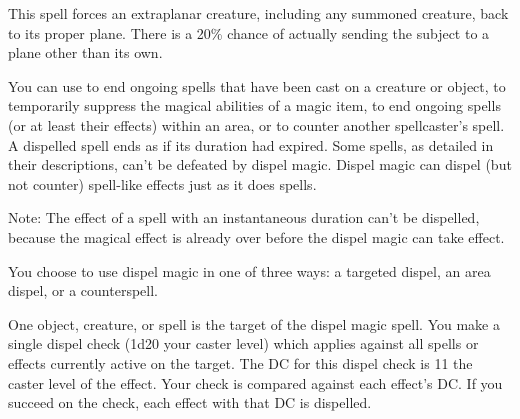 \begin{spelleffect}
    This spell forces an extraplanar creature, including any summoned creature, back to its proper plane. There is a 20\% chance of actually sending the subject to a plane other than its own.
\end{spelleffect}

\begin{spelleffect}
    You can use  to end ongoing spells that have been cast on a creature or object, to temporarily suppress the magical abilities of a magic item, to end ongoing spells (or at least their effects) within an area, or to counter another spellcaster's spell. A dispelled spell ends as if its duration had expired. Some spells, as detailed in their descriptions, can't be defeated by dispel magic. Dispel magic can dispel (but not counter) spell-like effects just as it does spells.
    \par Note: The effect of a spell with an instantaneous duration can't be dispelled, because the magical effect is already over before the dispel magic can take effect. 
    \par You choose to use dispel magic in one of three ways: a targeted dispel, an area dispel, or a counterspell.

    \par {} One object, creature, or spell is the target of the dispel magic spell. You make a single dispel check (1d20 \add your caster level) which applies against all spells or effects currently active on the target. The DC for this dispel check is 11 \add the caster level of the effect. Your check is compared against each effect's DC. If you succeed on the check, each effect with that DC is dispelled.


\end{spelleffect}
